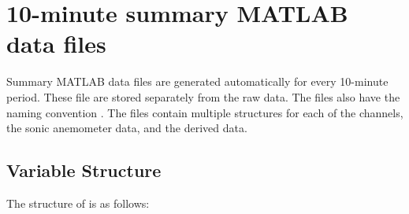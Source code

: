\chapter{10-minute summary MATLAB data files \label{s:TenMinuteMatFiles}}
Summary MATLAB data files are generated automatically for every 10-minute period. These file are stored separately from the raw data. The files also have the naming convention . The files contain multiple structures for each of the channels, the sonic anemometer data, and the derived data. 

\section{Variable Structure}
The structure of  is as follows:

